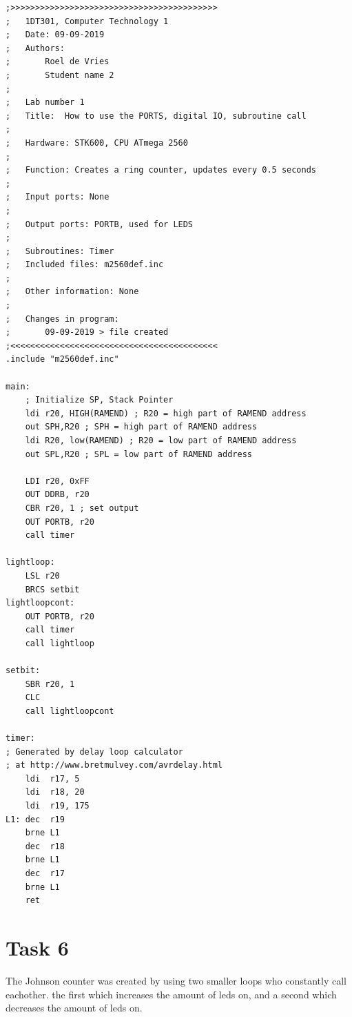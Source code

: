 \documentclass[a4paper,12pt]{article}
\begin{document}
\begin{lstlisting}
;>>>>>>>>>>>>>>>>>>>>>>>>>>>>>>>>>>>>>>>>>>
;	1DT301, Computer Technology 1
;	Date: 09-09-2019
;	Authors:
;		Roel de Vries
;		Student name 2
;
;	Lab number 1
;	Title:	How to use the PORTS, digital IO, subroutine call
;
;	Hardware: STK600, CPU ATmega 2560
;
;	Function: Creates a ring counter, updates every 0.5 seconds
;
;	Input ports: None
;
;	Output ports: PORTB, used for LEDS
;
;	Subroutines: Timer
;	Included files: m2560def.inc
;
;	Other information: None
;
;	Changes in program: 
;		09-09-2019 > file created
;<<<<<<<<<<<<<<<<<<<<<<<<<<<<<<<<<<<<<<<<<<
.include "m2560def.inc"

main:
	; Initialize SP, Stack Pointer
	ldi r20, HIGH(RAMEND) ; R20 = high part of RAMEND address
	out SPH,R20 ; SPH = high part of RAMEND address
	ldi R20, low(RAMEND) ; R20 = low part of RAMEND address
	out SPL,R20 ; SPL = low part of RAMEND address

	LDI r20, 0xFF
	OUT DDRB, r20
	CBR r20, 1 ; set output
	OUT PORTB, r20
	call timer

lightloop:
	LSL r20
	BRCS setbit
lightloopcont:
	OUT PORTB, r20
	call timer
	call lightloop

setbit:
	SBR r20, 1
	CLC
	call lightloopcont

timer:
; Generated by delay loop calculator
; at http://www.bretmulvey.com/avrdelay.html
	ldi  r17, 5
    ldi  r18, 20
    ldi  r19, 175
L1: dec  r19
    brne L1
    dec  r18
    brne L1
    dec  r17
    brne L1
	ret

\end{lstlisting}

\section{Task 6}
The Johnson counter was created by using two smaller loops who constantly call eachother. the first which increases the amount of leds on, and a second which decreases the amount of leds on.

\lstset{style=Asm}
\end{document}
